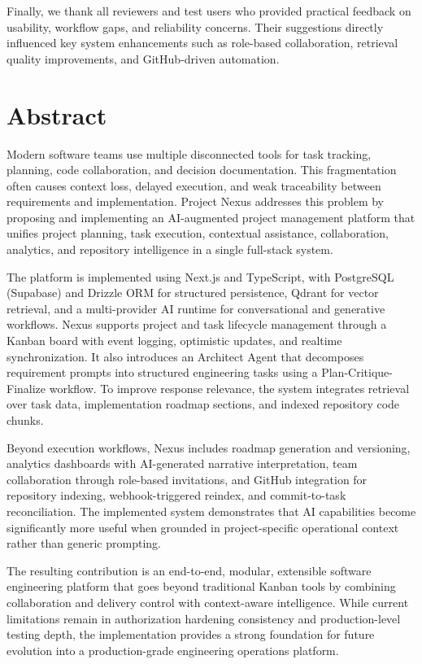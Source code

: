 \documentclass[a4paper, 11pt, oneside]{Dissertation}
\begin{document}
Finally, we thank all reviewers and test users who provided practical feedback on usability, workflow gaps, and reliability concerns. Their suggestions directly influenced key system enhancements such as role-based collaboration, retrieval quality improvements, and GitHub-driven automation.

\chapter*{Abstract}
\label{ch:abstract}
Modern software teams use multiple disconnected tools for task tracking, planning, code collaboration, and decision documentation. This fragmentation often causes context loss, delayed execution, and weak traceability between requirements and implementation. Project Nexus addresses this problem by proposing and implementing an AI-augmented project management platform that unifies project planning, task execution, contextual assistance, collaboration, analytics, and repository intelligence in a single full-stack system.

The platform is implemented using Next.js and TypeScript, with PostgreSQL (Supabase) and Drizzle ORM for structured persistence, Qdrant for vector retrieval, and a multi-provider AI runtime for conversational and generative workflows. Nexus supports project and task lifecycle management through a Kanban board with event logging, optimistic updates, and realtime synchronization. It also introduces an Architect Agent that decomposes requirement prompts into structured engineering tasks using a Plan-Critique-Finalize workflow. To improve response relevance, the system integrates retrieval over task data, implementation roadmap sections, and indexed repository code chunks.

Beyond execution workflows, Nexus includes roadmap generation and versioning, analytics dashboards with AI-generated narrative interpretation, team collaboration through role-based invitations, and GitHub integration for repository indexing, webhook-triggered reindex, and commit-to-task reconciliation. The implemented system demonstrates that AI capabilities become significantly more useful when grounded in project-specific operational context rather than generic prompting.

The resulting contribution is an end-to-end, modular, extensible software engineering platform that goes beyond traditional Kanban tools by combining collaboration and delivery control with context-aware intelligence. While current limitations remain in authorization hardening consistency and production-level testing depth, the implementation provides a strong foundation for future evolution into a production-grade engineering operations platform.
\end{document}
